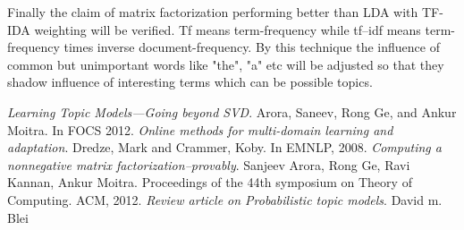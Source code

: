 \documentclass[a4paper,11pt]{article}
\begin{document}
Finally the claim of matrix factorization performing better than LDA with TF-IDA weighting will be verified. Tf means term-frequency while tf–idf means term-frequency times inverse document-frequency. By this technique the influence of common but unimportant words like "the", "a" etc will be adjusted so that they shadow influence of interesting terms which can be possible topics. 

\begin{thebibliography}{99}
 \textit{Learning Topic Models---Going beyond SVD}. Arora, Saneev, Rong Ge, and Ankur Moitra. In FOCS 2012.
 \textit{Online methods for multi-domain learning and adaptation}. Dredze, Mark and Crammer, Koby. In
EMNLP, 2008.
 \textit{Computing a nonnegative matrix factorization--provably}. Sanjeev Arora, Rong Ge, Ravi Kannan, Ankur Moitra. Proceedings of the 44th symposium on Theory of Computing. ACM, 2012.  
 \textit{Review article on Probabilistic topic models}. David m. Blei  
\end{thebibliography}



\pagebreak
\end{document}
